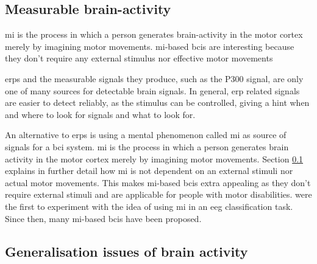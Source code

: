 \lipsum[1-3]


\subsection{Measurable brain-activity}
\label{subsec:biomedical_signals_brain_signals_measurable_brain_activity}



\lipsum[1-7]

\Gls{mi} is the process in which a person generates brain-activity in the motor cortex merely by imagining motor movements.
\Gls{mi}-based \glspl{bci} are interesting because they don't require any external stimulus nor effective motor movements

\glspl{erp} and the measurable signals they produce, such as the P300 signal, are only one of many sources for detectable brain signals.
In general, \gls{erp} related signals are easier to detect reliably, as the stimulus can be controlled, giving a hint when and where to look for signals and what to look for.

An alternative to \glspl{erp} is using a mental phenomenon called \gls{mi} as source of signals for a \gls{bci} system.
\Gls{mi} is the process in which a person generates brain activity in the motor cortex merely by imagining motor movements.
Section \ref{subsec:biomedical_signals_brain_signals_measurable_brain_activity} explains in further detail how \gls{mi} is not dependent on an external stimuli nor actual motor movements.
This makes \gls{mi}-based \glspl{bci} extra appealing as they don't require external stimuli and are applicable for people with motor disabilities.
 were the first to experiment with the idea of using \gls{mi} in an \gls{eeg} classification task.
Since then, many \gls{mi}-based \glspl{bci} have been proposed.


\subsection{Generalisation issues of brain activity}
\label{subsec:biomedical_signals_brain_signals_generalisation}

